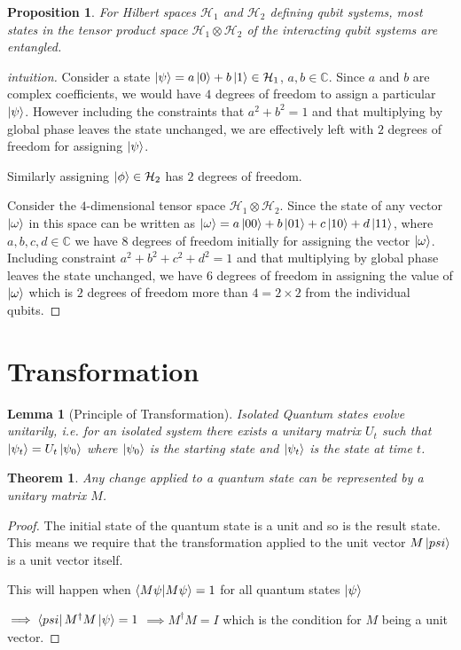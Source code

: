 \documentclass[12pt,twoside]{report}
\theoremstyle{thmstyle}
\newtheorem{thm}[subsection]{Theorem}
\newtheorem{lemma}[subsection]{Lemma}
\newtheorem{prop}[subsection]{Proposition}
\begin{document}
\begin{prop}
    For Hilbert spaces $\mathcal{H}_1$ and $\mathcal{H}_2$ defining qubit systems, most states in the tensor product space $\mathcal{H}_1 \otimes \mathcal{H}_2$ of the interacting qubit systems are entangled.
\end{prop}
\begin{proof}[intuition]
    Consider a state $\ket{\psi} = a \ket{0} + b \ket{1} \in \mathcal{H}_1$, $a,b \in \mathbb{C}$. Since $a$ and $b$ are complex coefficients, we would have $4$ degrees of freedom to assign a particular $\ket{\psi}$. However including the constraints that $a^2 + b^2 = 1$ and that multiplying by global phase leaves the state unchanged, we are effectively left with $2$ degrees of freedom for assigning $\ket{\psi}$. 
    
Similarly assigning $\ket{\phi} \in \mathcal{H}_2$ has $2$ degrees of freedom.

    Consider the $4$-dimensional tensor space $\mathcal{H}_1 \otimes \mathcal{H}_2$. Since the state of any vector $\ket{\omega}$ in this space can be written as $\ket{\omega} = a \ket{00} + b \ket{01} + c \ket{10} + d \ket{11}$, where $a, b, c, d \in \mathbb{C}$ we have $8$ degrees of freedom initially for assigning the vector $\ket{\omega}$. Including constraint $a^2 + b^2 + c^2 + d^2 = 1$ and that multiplying by global phase leaves the state unchanged, we have $6$ degrees of freedom in assigning the value of $\ket{\omega}$ which is $2$ degrees of freedom more than $4 = 2 \times 2$ from the individual qubits.
\end{proof}

\section{Transformation}

\begin{lemma}[Principle of Transformation]
    Isolated Quantum states evolve unitarily, i.e. for an isolated system there exists a unitary matrix $U_t$ such that $\ket{\psi_t} = U_t \ket{\psi_0}$ where $\ket{\psi_0}$ is the starting state and $\ket{\psi_t}$ is the state at time $t$.
\end{lemma}

\begin{thm}
    Any change applied to a quantum state can be represented by a unitary matrix $M$.
\end{thm}
\begin{proof}
    The initial state of the quantum state is a unit and so is the result state. This means we require that the transformation applied to the unit vector $M \ket{psi}$ is a unit vector itself.

    This will happen when $\braket{M \psi | M\psi} = 1$ for all quantum states $\ket{\psi}$

    $\implies \bra{psi} M^\dagger M \ket{\psi} = 1$
    $\implies M^\dagger M = I$ which is the condition for $M$ being a unit vector.
\end{proof}
\end{document}
